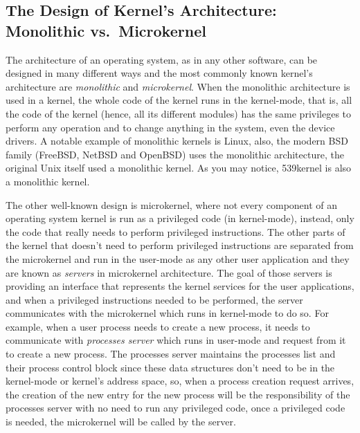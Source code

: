\subsection{The Design of Kernel's Architecture: Monolithic
vs.~Microkernel}\label{the-design-of-kernels-architecture-monolithic-vs.microkernel}

The architecture of an operating system, as in any other software, can
be designed in many different ways and the most commonly known kernel's
architecture are \emph{monolithic} and \emph{microkernel}. When the
monolithic architecture is used in a kernel, the whole code of the
kernel runs in the kernel-mode, that is, all the code of the kernel
(hence, all its different modules) has the same privileges to perform
any operation and to change anything in the system, even the device
drivers. A notable example of monolithic kernels is Linux, also, the
modern BSD family (FreeBSD, NetBSD and OpenBSD) uses the monolithic
architecture, the original Unix itself used a monolithic kernel. As you
may notice, 539kernel is also a monolithic kernel.

The other well-known design is microkernel, where not every component of
an operating system kernel is run as a privileged code (in kernel-mode),
instead, only the code that really needs to perform privileged
instructions. The other parts of the kernel that doesn't need to perform
privileged instructions are separated from the microkernel and run in
the user-mode as any other user application and they are known as
\emph{servers} in microkernel architecture. The goal of those servers is
providing an interface that represents the kernel services for the user
applications, and when a privileged instructions needed to be performed,
the server communicates with the microkernel which runs in kernel-mode
to do so. For example, when a user process needs to create a new
process, it needs to communicate with \emph{processes server} which runs
in user-mode and request from it to create a new process. The processes
server maintains the processes list and their process control block
since these data structures don't need to be in the kernel-mode or
kernel's address space, so, when a process creation request arrives, the
creation of the new entry for the new process will be the responsibility
of the processes server with no need to run any privileged code, once a
privileged code is needed, the microkernel will be called by the server.

